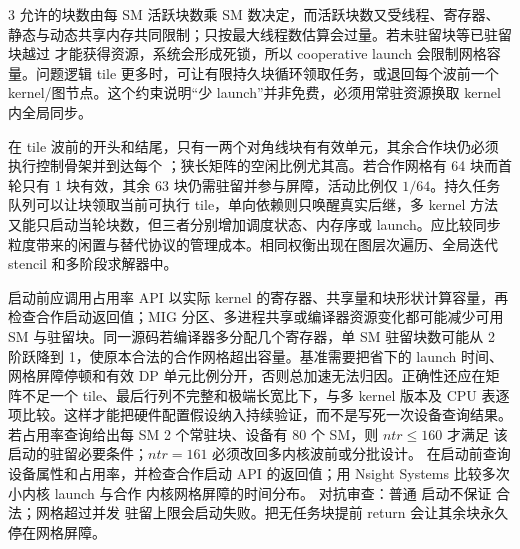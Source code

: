 \begin{solutionexercise}{3}
允许的块数由每 SM 活跃块数乘 SM 数决定，而活跃块数又受线程、寄存器、静态与动态共享内存共同限制；只按最大线程数估算会过量。若未驻留块等已驻留块越过  才能获得资源，系统会形成死锁，所以 cooperative launch 会限制网格容量。问题逻辑 tile 更多时，可让有限持久块循环领取任务，或退回每个波前一个 kernel/图节点。这个约束说明“少 launch”并非免费，必须用常驻资源换取 kernel 内全局同步。

在 tile 波前的开头和结尾，只有一两个对角线块有有效单元，其余合作块仍必须执行控制骨架并到达每个 ；狭长矩阵的空闲比例尤其高。若合作网格有 64 块而首轮只有 1 块有效，其余 63 块仍需驻留并参与屏障，活动比例仅 $1/64$。持久任务队列可以让块领取当前可执行 tile，单向依赖则只唤醒真实后继，多 kernel 方法又能只启动当轮块数，但三者分别增加调度状态、内存序或 launch。应比较同步粒度带来的闲置与替代协议的管理成本。相同权衡出现在图层次遍历、全局迭代 stencil 和多阶段求解器中。

启动前应调用占用率 API 以实际 kernel 的寄存器、共享量和块形状计算容量，再检查合作启动返回值；MIG 分区、多进程共享或编译器资源变化都可能减少可用 SM 与驻留块。同一源码若编译器多分配几个寄存器，单 SM 驻留块数可能从 2 阶跃降到 1，使原本合法的合作网格超出容量。基准需要把省下的 launch 时间、网格屏障停顿和有效 DP 单元比例分开，否则总加速无法归因。正确性还应在矩阵不足一个 tile、最后行列不完整和极端长宽比下，与多 kernel 版本及 CPU 表逐项比较。这样才能把硬件配置假设纳入持续验证，而不是写死一次设备查询结果。
\variantheading 若占用率查询给出每 SM 2 个常驻块、设备有 80 个 SM，则 $ntr\le160$ 才满足
该启动的驻留必要条件；$ntr=161$ 必须改回多内核波前或分批设计。
\practiceheading 在启动前查询设备属性和占用率，并检查合作启动 API 的返回值；用
Nsight Systems 比较多次小内核 launch 与合作
内核网格屏障的时间分布。
对抗审查：普通 \code{<<<>>>} 启动不保证  合法；网格超过并发
驻留上限会启动失败。把无任务块提前 return 会让其余块永久停在网格屏障。
\end{solutionexercise}

